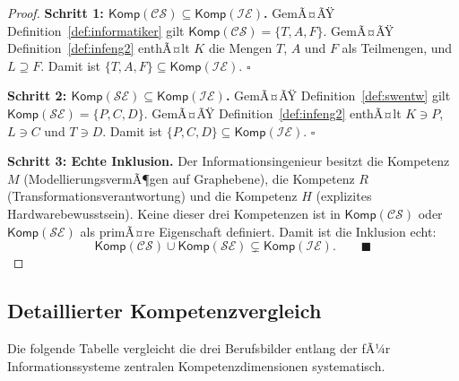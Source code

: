 ﻿\documentclass[a4paper,12pt]{report}
\theoremstyle{definition}
\begin{document}
\begin{proof}
\textbf{Schritt 1: $\mathsf{Komp}(\mathcal{CS}) \subseteq \mathsf{Komp}(\mathcal{IE})$.}
GemÃ¤ÃŸ Definition~\ref{def:informatiker} gilt
$\mathsf{Komp}(\mathcal{CS}) = \{T, A, F\}$.
GemÃ¤ÃŸ Definition~\ref{def:infeng2} enthÃ¤lt $K$ die Mengen $T$, $A$ und $F$ als Teilmengen,
und $L \supseteq F$. Damit ist $\{T, A, F\} \subseteq \mathsf{Komp}(\mathcal{IE})$. $\square$

\textbf{Schritt 2: $\mathsf{Komp}(\mathcal{SE}) \subseteq \mathsf{Komp}(\mathcal{IE})$.}
GemÃ¤ÃŸ Definition~\ref{def:swentw} gilt
$\mathsf{Komp}(\mathcal{SE}) = \{P, C, D\}$.
GemÃ¤ÃŸ Definition~\ref{def:infeng2} enthÃ¤lt $K \ni P$, $L \ni C$ und $T \ni D$.
Damit ist $\{P, C, D\} \subseteq \mathsf{Komp}(\mathcal{IE})$. $\square$

\textbf{Schritt 3: Echte Inklusion.}
Der Informationsingenieur besitzt die Kompetenz $M$ (ModellierungsvermÃ¶gen auf Graphebene),
die Kompetenz $R$ (Transformationsverantwortung) und die Kompetenz $H$
(explizites Hardwarebewusstsein). Keine dieser drei Kompetenzen ist in
$\mathsf{Komp}(\mathcal{CS})$ oder $\mathsf{Komp}(\mathcal{SE})$ als primÃ¤re Eigenschaft
definiert. Damit ist die Inklusion echt:
\[
  \mathsf{Komp}(\mathcal{CS}) \cup \mathsf{Komp}(\mathcal{SE}) \subsetneq \mathsf{Komp}(\mathcal{IE}).
  \qquad \blacksquare
\]
\end{proof}

\subsection{Detaillierter Kompetenzvergleich}

Die folgende Tabelle vergleicht die drei Berufsbilder entlang der fÃ¼r
Informationssysteme zentralen Kompetenzdimensionen systematisch.
\end{document}
